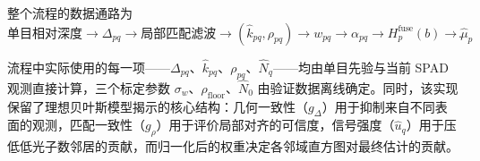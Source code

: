 \documentclass[11pt,a4paper]{ctexart}
\numberwithin{equation}{section}
\begin{document}
整个流程的数据通路为
\begin{equation}
    \boxed{
    \text{单目相对深度}
    \rightarrow
    \Delta_{pq}
    \rightarrow
    \text{局部匹配滤波}
    \rightarrow
    (\hat k_{pq},\rho_{pq})
    \rightarrow
    w_{pq}
    \rightarrow
    \alpha_{pq}
    \rightarrow
    H_p^{\mathrm{fuse}}(b)
    \rightarrow
    \hat\mu_p
    }.
    \label{eq:final_algorithm_chain}
\end{equation}

流程中实际使用的每一项——$\Delta_{pq}$、$\hat k_{pq}$、$\rho_{pq}$、$\hat N_q$——均由单目先验与当前 SPAD 观测直接计算，三个标定参数 $\sigma_w$、$\rho_{\mathrm{floor}}$、$\hat N_0$ 由验证数据离线确定。同时，该实现保留了理想贝叶斯模型揭示的核心结构：几何一致性（$g_\Delta$）用于抑制来自不同表面的观测，匹配一致性（$g_\rho$）用于评价局部对齐的可信度，信号强度（$\hat u_q$）用于压低低光子数邻居的贡献，而归一化后的权重决定各邻域直方图对最终估计的贡献。
\end{document}
